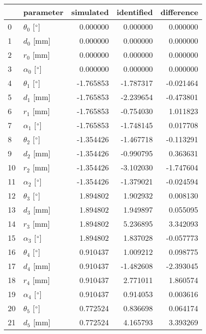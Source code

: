 \documentclass{standalone}%
\begin{document}
%
\normalsize%
\begin{tabular}{llrrr}
\toprule
{} &                 parameter & simulated & identified & difference \\
\midrule
0  &  $\theta_{0}$ [$\degree$] &  0.000000 &   0.000000 &   0.000000 \\
1  &              $d_{0}$ [mm] &  0.000000 &   0.000000 &   0.000000 \\
2  &              $r_{0}$ [mm] &  0.000000 &   0.000000 &   0.000000 \\
3  &  $\alpha_{0}$ [$\degree$] &  0.000000 &   0.000000 &   0.000000 \\
4  &  $\theta_{1}$ [$\degree$] & -1.765853 &  -1.787317 &  -0.021464 \\
5  &              $d_{1}$ [mm] & -1.765853 &  -2.239654 &  -0.473801 \\
6  &              $r_{1}$ [mm] & -1.765853 &  -0.754030 &   1.011823 \\
7  &  $\alpha_{1}$ [$\degree$] & -1.765853 &  -1.748145 &   0.017708 \\
8  &  $\theta_{2}$ [$\degree$] & -1.354426 &  -1.467718 &  -0.113291 \\
9  &              $d_{2}$ [mm] & -1.354426 &  -0.990795 &   0.363631 \\
10 &              $r_{2}$ [mm] & -1.354426 &  -3.102030 &  -1.747604 \\
11 &  $\alpha_{2}$ [$\degree$] & -1.354426 &  -1.379021 &  -0.024594 \\
12 &  $\theta_{3}$ [$\degree$] &  1.894802 &   1.902932 &   0.008130 \\
13 &              $d_{3}$ [mm] &  1.894802 &   1.949897 &   0.055095 \\
14 &              $r_{3}$ [mm] &  1.894802 &   5.236895 &   3.342093 \\
15 &  $\alpha_{3}$ [$\degree$] &  1.894802 &   1.837028 &  -0.057773 \\
16 &  $\theta_{4}$ [$\degree$] &  0.910437 &   1.009212 &   0.098775 \\
17 &              $d_{4}$ [mm] &  0.910437 &  -1.482608 &  -2.393045 \\
18 &              $r_{4}$ [mm] &  0.910437 &   2.771011 &   1.860574 \\
19 &  $\alpha_{4}$ [$\degree$] &  0.910437 &   0.914053 &   0.003616 \\
20 &  $\theta_{5}$ [$\degree$] &  0.772524 &   0.836698 &   0.064174 \\
21 &              $d_{5}$ [mm] &  0.772524 &   4.165793 &   3.393269 \\

\end{tabular}
\end{document}
